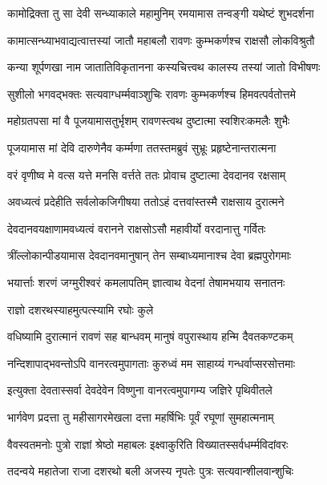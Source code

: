 \twolineshloka
{कामोद्रिक्ता तु सा देवी सन्ध्याकाले महामुनिम्}
{रमयामास तन्वङ्गी यथेष्टं शुभदर्शना}%

\twolineshloka
{कामात्सन्ध्याभवाद्यत्वात्तस्यां जातौ महाबलौ}
{रावणः कुम्भकर्णश्च राक्षसौ लोकविश्रुतौ}%

\twolineshloka
{कन्या शूर्पणखा नाम जातातिविकृतानना}
{कस्यचित्त्वथ कालस्य तस्यां जातो विभीषणः}%

\twolineshloka
{सुशीलो भगवद्भक्तः सत्यवाग्धर्म्मवाञ्शुचिः}
{रावणः कुम्भकर्णश्च हिमवत्पर्वतोत्तमे}%

\twolineshloka
{महोग्रतपसा मां वै पूजयामासतुर्भृशम्}
{रावणस्त्वथ दुष्टात्मा स्वशिरःकमलैः शुभैः}%

\twolineshloka
{पूजयामास मां देवि दारुणेनैव कर्म्मणा}
{ततस्तमब्रुवं सुभ्रूः प्रहृष्टेनान्तरात्मना}%

\twolineshloka
{वरं वृणीष्व मे वत्स यत्ते मनसि वर्त्तते}
{ततः प्रोवाच दुष्टात्मा देवदानव रक्षसाम्}%

\twolineshloka
{अवध्यत्वं प्रदेहीति सर्वलोकजिगीषया}
{ततोऽहं दत्तवांस्तस्मै राक्षसाय दुरात्मने}%

\twolineshloka
{देवदानवयक्षाणामवध्यत्वं वरानने}
{राक्षसोऽसौ महावीर्यो वरदानात्तु गर्वितः}%

\twolineshloka
{त्रींल्लोकान्पीडयामास देवदानवमानुषान्}
{तेन सम्बाध्यमानाश्च देवा ब्रह्मपुरोगमाः}%

\twolineshloka
{भयार्त्ताः शरणं जग्मुरीश्वरं कमलापतिम्}
{ज्ञात्वाथ वेदनां तेषामभयाय सनातनः}%


\onelineshloka
{राज्ञो दशरथस्याहमुत्पत्स्यामि रघोः कुले}%

\twolineshloka
{वधिष्यामि दुरात्मानं रावणं सह बान्धवम्}
{मानुषं वपुरास्थाय हन्मि दैवतकण्टकम्}%

\twolineshloka
{नन्दिशापाद्भवन्तोऽपि वानरत्वमुपागताः}
{कुरुध्वं मम साहाय्यं गन्धर्वाप्सरसोत्तमाः}%


\twolineshloka
{इत्युक्ता देवतास्सर्वा देवदेवेन विष्णुना}
{वानरत्वमुपागम्य जज्ञिरे पृथिवीतले}%

\twolineshloka
{भार्गवेण प्रदत्ता तु महीसागरमेखला}
{दत्ता महर्षिभिः पूर्वं रघूणां सुमहात्मनाम्}%

\twolineshloka
{वैवस्वतमनोः पुत्रो राज्ञां श्रेष्ठो महाबलः}
{इक्ष्वाकुरिति विख्यातस्सर्वधर्म्मविदांवरः}%

\twolineshloka
{तदन्वये महातेजा राजा दशरथो बली}
{अजस्य नृपतेः पुत्रः सत्यवान्शीलवान्शुचिः}%

